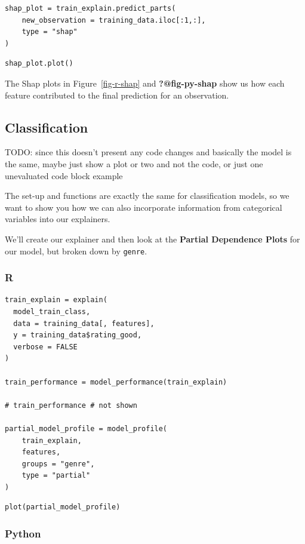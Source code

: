 \documentclass[
  letterpaper,
]{krantz}
\begin{document}
\begin{verbatim}
shap_plot = train_explain.predict_parts(
    new_observation = training_data.iloc[:1,:], 
    type = "shap"
)
\end{verbatim}

\begin{verbatim}
shap_plot.plot()
\end{verbatim}

The Shap plots in Figure~\ref{fig-r-shap} and \textbf{?@fig-py-shap}
show us how each feature contributed to the final prediction for an
observation.

\subsection{Classification}\label{classification}

TODO: since this doesn't present any code changes and basically the
model is the same, maybe just show a plot or two and not the code, or
just one unevaluated code block example

The set-up and functions are exactly the same for classification models,
so we want to show you how we can also incorporate information from
categorical variables into our explainers.

We'll create our explainer and then look at the \textbf{Partial
Dependence Plots} for our model, but broken down by \texttt{genre}.

\subsubsection{R}

\begin{verbatim}
train_explain = explain(
  model_train_class, 
  data = training_data[, features], 
  y = training_data$rating_good,
  verbose = FALSE
)

train_performance = model_performance(train_explain)

# train_performance # not shown

partial_model_profile = model_profile(
    train_explain, 
    features, 
    groups = "genre",
    type = "partial"
)
\end{verbatim}

\begin{verbatim}
plot(partial_model_profile)
\end{verbatim}

\subsubsection{Python}
\end{document}

